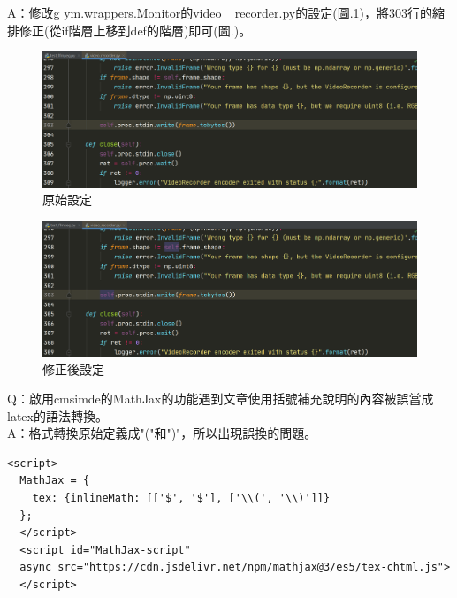 \documentclass[14pt,a4paper]{report}  %
\begin{document}
A：修改g ym.wrappers.Monitor的video\_ recorder.py的設定(圖.\ref{fig.video_recorder})，將303行的縮排修正(從if階層上移到def的階層)即可(圖.)。\\
\begin{figure}[hbt!]
\begin{center}
\includegraphics[width=15cm]{video_recorder}
\caption{\Large 原始設定}
\label{fig.video_recorder}
\end{center}
\end{figure}

\begin{figure}[hbt!]
\begin{center}
\includegraphics[width=15cm]{修正video_recorder}
\caption{\Large 修正後設定}
\label{fig.修正video_recorder}
\end{center}
\end{figure}
\newpage %

\hspace{-1.7em} Q：啟用cmsimde的MathJax的功能遇到文章使用括號補充說明的內容被誤當成latex的語法轉換。\\
\hspace{-1.7em} A：格式轉換原始定義成"("和")"，所以出現誤換的問題。\\
\begin{lstlisting}[caption=\Large\sectionef MathJax 程式碼]
<script>
  MathJax = {
    tex: {inlineMath: [['$', '$'], ['\\(', '\\)']]}
  };
  </script>
  <script id="MathJax-script" 
  async src="https://cdn.jsdelivr.net/npm/mathjax@3/es5/tex-chtml.js"> 
  </script>
\end{lstlisting}
\end{document}
